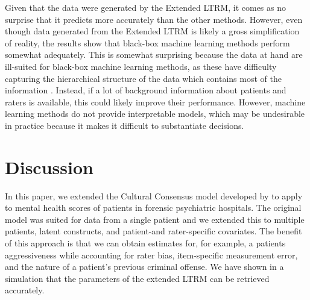 \documentclass[a4paper,usenames,dvipsnames]{article}
\newenvironment{revision}{\color{teal}}{\color{black}}
\begin{document}
Given that the data were generated by the \begin{revision}Extended \end{revision}LTRM, it comes as no surprise that it predicts more accurately than the other methods. However, even though data generated from the \begin{revision}Extended \end{revision}LTRM is likely a gross simplification of reality, the results show that black-box machine learning methods perform somewhat adequately. This is somewhat surprising because the data at hand are ill-suited for black-box machine learning methods, as these have difficulty capturing the hierarchical structure of the data which contains most of the information \cite<but see>{hajjem2014mixed}. Instead, if a lot of background information about patients and raters is available, this could likely improve their performance. However, machine learning methods do not provide interpretable models, which may be undesirable in practice because it makes it difficult to substantiate decisions.

\section*{Discussion}

In this paper, we extended the Cultural Consensus model developed by  to apply to mental health scores of patients in forensic psychiatric hospitals. The original model was suited for data from a single patient and we extended this to multiple patients, latent constructs, and patient-and rater-specific covariates. The benefit of this approach is that we can obtain estimates for, for example, a patients aggressiveness while accounting for rater bias, item-specific measurement error, and the nature of a patient's previous criminal offense. We have shown in a simulation that the parameters of the extended LTRM can be retrieved accurately.
\end{document}

